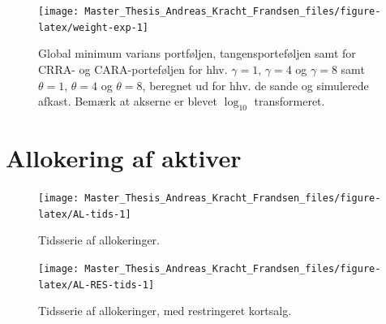 \documentclass[
  a4paper,
  oneside]{memoir}
\begin{document}
\begin{figure}[H]

{\centering \texttt{[image: Master\_Thesis\_Andreas\_Kracht\_Frandsen\_files/figure-latex/weight-exp-1]} 

}

\caption{Global minimum varians portføljen, tangensporteføljen samt for CRRA- og CARA-porteføljen for hhv. $\gamma=1$, $\gamma=4$ og $\gamma=8$ samt $\theta=1$, $\theta=4$ og $\theta=8$, beregnet ud for hhv. de sande og simulerede afkast. Bemærk at akserne er blevet $\log_{10}$ transformeret.}\label{fig:weight-exp}
\end{figure}

\hypertarget{allokering-af-aktiver}{%
\chapter{Allokering af aktiver}\label{allokering-af-aktiver}}

\begin{figure}[H]

{\centering \texttt{[image: Master\_Thesis\_Andreas\_Kracht\_Frandsen\_files/figure-latex/AL-tids-1]} 

}

\caption{Tidsserie af allokeringer.}\label{fig:AL-tids}
\end{figure}

\begin{figure}[H]

{\centering \texttt{[image: Master\_Thesis\_Andreas\_Kracht\_Frandsen\_files/figure-latex/AL-RES-tids-1]} 

}

\caption{Tidsserie af allokeringer, med restringeret kortsalg.}\label{fig:AL-RES-tids}
\end{figure}
\end{document}
